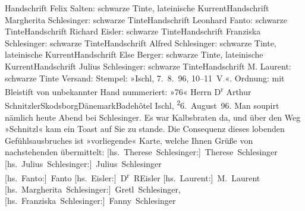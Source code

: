 \begin{ledgroupsized}[t]{13cm}
{\newline{}Handschrift Felix Salten: schwarze Tinte, lateinische Kurrent\newline{}Handschrift Margherita Schlesinger: schwarze Tinte\newline{}Handschrift Leonhard Fanto: schwarze Tinte\newline{}Handschrift Richard Eisler: schwarze Tinte\newline{}Handschrift Franziska Schlesinger: schwarze Tinte\newline{}Handschrift Alfred Schlesinger: schwarze Tinte, lateinische Kurrent\newline{}Handschrift Else Berger: schwarze Tinte, lateinische Kurrent\newline{}Handschrift Julius Schlesinger: schwarze Tinte\newline{}Handschrift M. Laurent: schwarze Tinte
\newline{}Versand: Stempel: »\nobreak{}Ischl, 7. 8. 96, 10–11 V\textcolor{gray}{.}\nobreak{}«.  
\newline{}Ordnung: mit Bleistift von unbekannter Hand nummeriert: »76« }\toendnotes[C]{\smallbreak}\pstart{}{\pb}Herrn D\textsuperscript{r} Arthur Schnitzler\pend{}\pstart{}Skodsborg\pend{}\pstart{}Dänemark\pend{}\pstart{}Badehôtel\pend{}{\bigskip}\pstart
           \raggedleft{}{\pb}Ischl, \substVorne{}\textsuperscript{2}\substDazwischen{}6\substHinten{}. August 96.\pend
           \pstart
           Man soupirt nämlich heute{ }Abend bei Schlesinger.
               Es war Kalbsbraten da, und über den Weg »Schnitzl« kam ein Toast auf Sie zu stande.
               Die Consequenz dieses lobenden Gefühlsausbruches ist »vorliegende« Karte, welche
               Ihnen Grüße von nachstehenden \label{K_L03177-1v}\label{K_L03177-1h} übermittelt:\pend
           \pstart
           \spacefill\mbox{{[}hs. Therese Schlesinger:{]} Therese Schlesinger}{ }\spacefill\mbox{{[}hs. Julius Schlesinger:{]} Julius Schlesinger}{\\}\spacefill\mbox{{[}hs. Fanto:{]} Fanto}{ }\spacefill\mbox{{[}hs. Eisler:{]} D\textsuperscript{r} REisler}{ }\spacefill\mbox{{[}hs. Laurent:{]} M. Laurent}{\\}\spacefill\mbox{{[}hs. Margherita Schlesinger:{]} Gretl Schlesinger,}{ }\spacefill\mbox{{[}hs. Franziska Schlesinger:{]} Fanny Schlesinger}\pend

\end{ledgroupsized}
